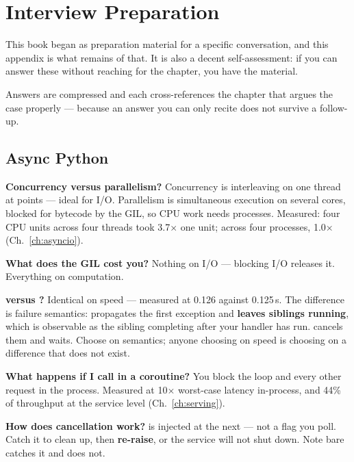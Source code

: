 \chapter{Interview Preparation}
\label{app:interview}

\noindent
This book began as preparation material for a specific conversation, and this
appendix is what remains of that. It is also a decent self-assessment: if you can
answer these without reaching for the chapter, you have the material.

Answers are compressed and each cross-references the chapter that argues the case
properly --- because an answer you can only recite does not survive a follow-up.

\section{Async Python}
\label{sec:appD-async}

\textbf{Concurrency versus parallelism?} Concurrency is interleaving on one
thread at  points --- ideal for I/O. Parallelism is simultaneous
execution on several cores, blocked for bytecode by the GIL, so CPU work needs
processes. Measured: four CPU units across four threads took 3.7$\times$ one
unit; across four processes, 1.0$\times$ (Ch.~\ref{ch:asyncio}).

\textbf{What does the GIL cost you?} Nothing on I/O --- blocking I/O releases it.
Everything on computation.

\textbf{ versus ?} Identical on speed --- measured
at 0.126 against 0.125\,s. The difference is failure semantics: 
propagates the first exception and \textbf{leaves siblings running}, which is
observable as the sibling completing after your handler has run. 
cancels them and waits. Choose on semantics; anyone choosing on speed is choosing
on a difference that does not exist.

\textbf{What happens if I call  in a coroutine?} You block the
loop and every other request in the process. Measured at 10$\times$ worst-case
latency in-process, and 44\% of throughput at the service level
(Ch.~\ref{ch:serving}).

\textbf{How does cancellation work?}  is injected at the
next  --- not a flag you poll. Catch it to clean up, then
\textbf{re-raise}, or the service will not shut down. Note bare 
catches it and  does not.

